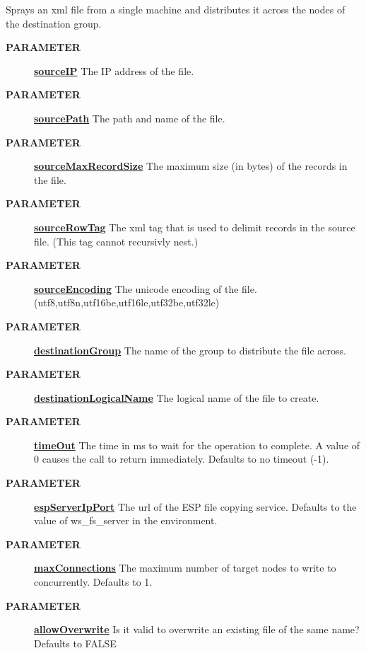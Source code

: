 \par
Sprays an xml file from a single machine and distributes it across the nodes of the destination group.

\par
\begin{description}
\item [\colorbox{tagtype}{\color{white} \textbf{\textsf{PARAMETER}}}] \textbf{\underline{sourceIP}} The IP address of the file.
\item [\colorbox{tagtype}{\color{white} \textbf{\textsf{PARAMETER}}}] \textbf{\underline{sourcePath}} The path and name of the file.
\item [\colorbox{tagtype}{\color{white} \textbf{\textsf{PARAMETER}}}] \textbf{\underline{sourceMaxRecordSize}} The maximum size (in bytes) of the records in the file.
\item [\colorbox{tagtype}{\color{white} \textbf{\textsf{PARAMETER}}}] \textbf{\underline{sourceRowTag}} The xml tag that is used to delimit records in the source file. (This tag cannot recursivly nest.)
\item [\colorbox{tagtype}{\color{white} \textbf{\textsf{PARAMETER}}}] \textbf{\underline{sourceEncoding}} The unicode encoding of the file. (utf8,utf8n,utf16be,utf16le,utf32be,utf32le)
\item [\colorbox{tagtype}{\color{white} \textbf{\textsf{PARAMETER}}}] \textbf{\underline{destinationGroup}} The name of the group to distribute the file across.
\item [\colorbox{tagtype}{\color{white} \textbf{\textsf{PARAMETER}}}] \textbf{\underline{destinationLogicalName}} The logical name of the file to create.
\item [\colorbox{tagtype}{\color{white} \textbf{\textsf{PARAMETER}}}] \textbf{\underline{timeOut}} The time in ms to wait for the operation to complete. A value of 0 causes the call to return immediately. Defaults to no timeout (-1).
\item [\colorbox{tagtype}{\color{white} \textbf{\textsf{PARAMETER}}}] \textbf{\underline{espServerIpPort}} The url of the ESP file copying service. Defaults to the value of ws\_fs\_server in the environment.
\item [\colorbox{tagtype}{\color{white} \textbf{\textsf{PARAMETER}}}] \textbf{\underline{maxConnections}} The maximum number of target nodes to write to concurrently. Defaults to 1.
\item [\colorbox{tagtype}{\color{white} \textbf{\textsf{PARAMETER}}}] \textbf{\underline{allowOverwrite}} Is it valid to overwrite an existing file of the same name? Defaults to FALSE

\end{description}
